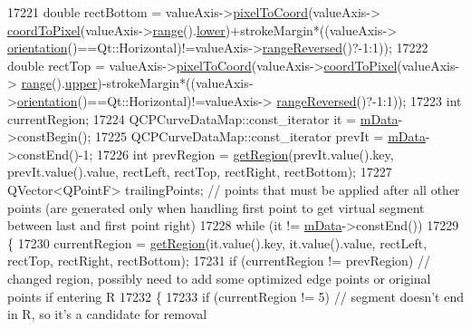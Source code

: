 \begin{DoxyCode}
17221   \textcolor{keywordtype}{double} rectBottom = valueAxis->\hyperlink{class_q_c_p_axis_ae9289ef7043b9d966af88eaa95b037d1}{pixelToCoord}(valueAxis->
      \hyperlink{class_q_c_p_axis_a985ae693b842fb0422b4390fe36d299a}{coordToPixel}(valueAxis->\hyperlink{class_q_c_p_axis_ab1ea79a4f5ea4cf42620f8f51c477ac4}{range}().\hyperlink{class_q_c_p_range_aa3aca3edb14f7ca0c85d912647b91745}{lower})+strokeMargin*((valueAxis->
      \hyperlink{class_q_c_p_axis_a57483f2f60145ddc9e63f3af53959265}{orientation}()==Qt::Horizontal)!=valueAxis->\hyperlink{class_q_c_p_axis_ade26dc7994ccd8a11f64fd83377ee021}{rangeReversed}()?-1:1));
17222   \textcolor{keywordtype}{double} rectTop = valueAxis->\hyperlink{class_q_c_p_axis_ae9289ef7043b9d966af88eaa95b037d1}{pixelToCoord}(valueAxis->\hyperlink{class_q_c_p_axis_a985ae693b842fb0422b4390fe36d299a}{coordToPixel}(valueAxis->
      \hyperlink{class_q_c_p_axis_ab1ea79a4f5ea4cf42620f8f51c477ac4}{range}().\hyperlink{class_q_c_p_range_ae44eb3aafe1d0e2ed34b499b6d2e074f}{upper})-strokeMargin*((valueAxis->\hyperlink{class_q_c_p_axis_a57483f2f60145ddc9e63f3af53959265}{orientation}()==Qt::Horizontal)!=valueAxis->
      \hyperlink{class_q_c_p_axis_ade26dc7994ccd8a11f64fd83377ee021}{rangeReversed}()?-1:1));
17223   \textcolor{keywordtype}{int} currentRegion;
17224   QCPCurveDataMap::const\_iterator it = \hyperlink{class_q_c_p_curve_a88d533e455bca96004b049e99168731b}{mData}->constBegin();
17225   QCPCurveDataMap::const\_iterator prevIt = \hyperlink{class_q_c_p_curve_a88d533e455bca96004b049e99168731b}{mData}->constEnd()-1;
17226   \textcolor{keywordtype}{int} prevRegion = \hyperlink{class_q_c_p_curve_a3af3183f35bd7aebe149f29ae4f1034a}{getRegion}(prevIt.value().key, prevIt.value().value, rectLeft, rectTop, 
      rectRight, rectBottom);
17227   QVector<QPointF> trailingPoints; \textcolor{comment}{// points that must be applied after all other points (are generated
       only when handling first point to get virtual segment between last and first point right)}
17228   \textcolor{keywordflow}{while} (it != \hyperlink{class_q_c_p_curve_a88d533e455bca96004b049e99168731b}{mData}->constEnd())
17229   \{
17230     currentRegion = \hyperlink{class_q_c_p_curve_a3af3183f35bd7aebe149f29ae4f1034a}{getRegion}(it.value().key, it.value().value, rectLeft, rectTop, rectRight, 
      rectBottom);
17231     \textcolor{keywordflow}{if} (currentRegion != prevRegion) \textcolor{comment}{// changed region, possibly need to add some optimized edge points or
       original points if entering R}
17232     \{
17233       \textcolor{keywordflow}{if} (currentRegion != 5) \textcolor{comment}{// segment doesn't end in R, so it's a candidate for removal}

\end{DoxyCode}
